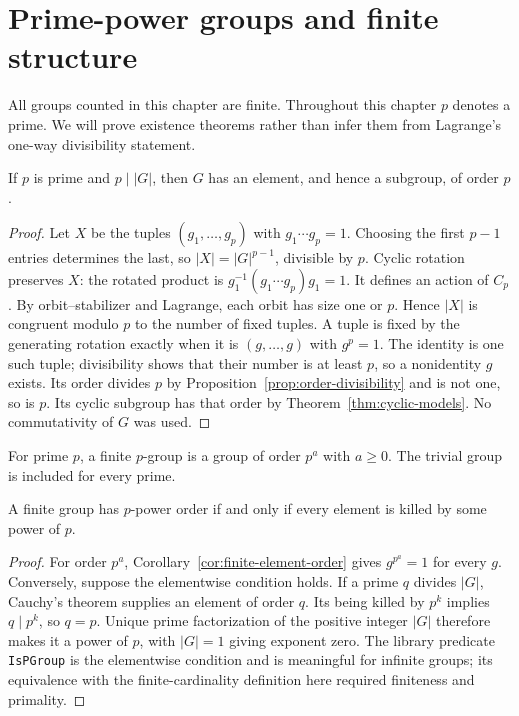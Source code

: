\chapter{Prime-power groups and finite structure}\label{chap:M07.06}

All groups counted in this chapter are finite. Throughout this chapter $p$ denotes a prime. We will prove existence theorems rather than infer them from Lagrange's one-way divisibility statement.

\begin{theorem}\label{thm:cauchy}
If $p$ is prime and $p\mid|G|$, then $G$ has an element, and hence a subgroup, of order $p$.
\end{theorem}
\begin{proof}
Let $X$ be the tuples $(g_1,\ldots,g_p)$ with $g_1\cdots g_p=1$. Choosing the first $p-1$ entries determines the last, so $|X|=|G|^{p-1}$, divisible by $p$. Cyclic rotation preserves $X$: the rotated product is $g_1^{-1}(g_1\cdots g_p)g_1=1$. It defines an action of $C_p$. By orbit--stabilizer and Lagrange, each orbit has size one or $p$. Hence $|X|$ is congruent modulo $p$ to the number of fixed tuples. A tuple is fixed by the generating rotation exactly when it is $(g,\ldots,g)$ with $g^p=1$. The identity is one such tuple; divisibility shows that their number is at least $p$, so a nonidentity $g$ exists. Its order divides $p$ by Proposition~\ref{prop:order-divisibility} and is not one, so is $p$. Its cyclic subgroup has that order by Theorem~\ref{thm:cyclic-models}. No commutativity of $G$ was used.
\end{proof}

\begin{definition}
For prime $p$, a finite $p$-group is a group of order $p^a$ with $a\geq0$. The trivial group is included for every prime.
\end{definition}
\begin{proposition}\label{prop:pgroup-characterization}
A finite group has $p$-power order if and only if every element is killed by some power of $p$.
\end{proposition}
\begin{proof}
For order $p^a$, Corollary~\ref{cor:finite-element-order} gives $g^{p^a}=1$ for every $g$. Conversely, suppose the elementwise condition holds. If a prime $q$ divides $|G|$, Cauchy's theorem supplies an element of order $q$. Its being killed by $p^k$ implies $q\mid p^k$, so $q=p$. Unique prime factorization of the positive integer $|G|$ therefore makes it a power of $p$, with $|G|=1$ giving exponent zero. The library predicate \texttt{IsPGroup} is the elementwise condition and is meaningful for infinite groups; its equivalence with the finite-cardinality definition here required finiteness and primality.
\end{proof}

